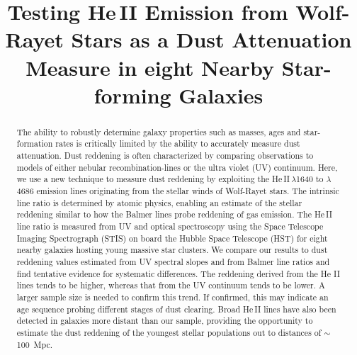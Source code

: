 \documentclass[linenumbers]{aastex63}
\begin{document}
\title{Testing He\,II Emission from Wolf-Rayet Stars as a Dust Attenuation Measure in eight Nearby Star-forming Galaxies}




\begin{abstract}
The ability to robustly determine galaxy properties such as masses, ages and star-formation rates is critically limited by the ability to accurately measure dust attenuation. 
Dust reddening is often characterized by comparing observations to models of either nebular recombination-lines or the ultra violet (UV) continuum. 
Here, we use a new technique to measure dust reddening by exploiting the He\,II\,$\lambda$1640 to $\lambda$4686 emission lines originating from the stellar winds of Wolf-Rayet stars. 
The intrinsic line ratio is determined by atomic physics, enabling an estimate of the stellar reddening similar to how the Balmer lines probe reddening of gas emission. 
The He\,II line ratio is measured from UV and optical spectroscopy using the Space Telescope Imaging Spectrograph (STIS) on board the Hubble Space Telescope (HST) for eight nearby galaxies hosting young massive star clusters.
We compare our results to dust reddening values estimated from UV spectral slopes and from Balmer line ratios and find tentative evidence for systematic differences. The reddening derived from the He II lines tends to be higher, whereas that from the UV continuum tends to be lower. A larger sample size is needed to confirm this trend. If confirmed, this may indicate an age sequence probing different stages of dust clearing.
Broad He\,II lines have also been detected in galaxies more distant than our sample, providing the opportunity to estimate the dust reddening of the youngest stellar populations out to distances of $\sim$100~Mpc.
\end{abstract}

\end{document}
